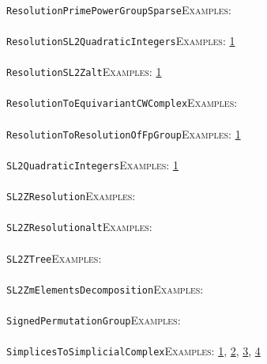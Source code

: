 \documentclass[a4paper,11pt]{report}
\begin{document}
{{ \\
 \texttt{ResolutionPrimePowerGroupSparse}{\nobreakspace}{\nobreakspace}{\nobreakspace}{\nobreakspace}\textsc{Examples:} \\
 \\
 \texttt{ResolutionSL2QuadraticIntegers}{\nobreakspace}{\nobreakspace}{\nobreakspace}{\nobreakspace}\textsc{Examples:} \href{tutorial/chap10.html} {1}{\nobreakspace} \\
 \\
 \texttt{ResolutionSL2Z{\textunderscore}alt}{\nobreakspace}{\nobreakspace}{\nobreakspace}{\nobreakspace}\textsc{Examples:} \href{tutorial/chap10.html} {1}{\nobreakspace} \\
 \\
 \texttt{ResolutionToEquivariantCWComplex}{\nobreakspace}{\nobreakspace}{\nobreakspace}{\nobreakspace}\textsc{Examples:} \\
 \\
 \texttt{ResolutionToResolutionOfFpGroup}{\nobreakspace}{\nobreakspace}{\nobreakspace}{\nobreakspace}\textsc{Examples:} \href{../www/SideLinks/About/aboutArithmetic.html} {1}{\nobreakspace} \\
 \\
 \texttt{SL2QuadraticIntegers}{\nobreakspace}{\nobreakspace}{\nobreakspace}{\nobreakspace}\textsc{Examples:} \href{tutorial/chap10.html} {1}{\nobreakspace} \\
 \\
 \texttt{SL2ZResolution}{\nobreakspace}{\nobreakspace}{\nobreakspace}{\nobreakspace}\textsc{Examples:} \\
 \\
 \texttt{SL2ZResolution{\textunderscore}alt}{\nobreakspace}{\nobreakspace}{\nobreakspace}{\nobreakspace}\textsc{Examples:} \\
 \\
 \texttt{SL2ZTree}{\nobreakspace}{\nobreakspace}{\nobreakspace}{\nobreakspace}\textsc{Examples:} \\
 \\
 \texttt{SL2ZmElementsDecomposition}{\nobreakspace}{\nobreakspace}{\nobreakspace}{\nobreakspace}\textsc{Examples:} \\
 \\
 \texttt{SignedPermutationGroup}{\nobreakspace}{\nobreakspace}{\nobreakspace}{\nobreakspace}\textsc{Examples:} \\
 \\
 \texttt{SimplicesToSimplicialComplex}{\nobreakspace}{\nobreakspace}{\nobreakspace}{\nobreakspace}\textsc{Examples:} \href{tutorial/chap3.html} {1}{\nobreakspace}, \href{../www/SideLinks/About/aboutCoveringSpaces.html} {2}{\nobreakspace}, \href{../www/SideLinks/About/aboutCoverinSpaces.html} {3}{\nobreakspace}, \href{../www/SideLinks/About/aboutCubical.html} {4}{\nobreakspace} \\
}}
\end{document}
